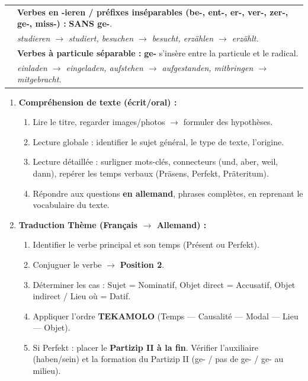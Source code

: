 \documentclass[11pt]{article}
\newcommand{\all}[1]{\ifmmode\text{\textit{#1}}\else\begingroup\selectlanguage{ngerman}\itshape #1\endgroup\fi}
\begin{document}
\begin{propriete}
\begin{center}
\begin{tabularx}{\linewidth}{|X|X|}
& \textbf{Verbes en -ieren / préfixes inséparables (be-, ent-, er-, ver-, zer-, ge-, miss-) :} \textbf{SANS ge-}. \\
& \all{studieren $\to$ studiert}, \all{besuchen $\to$ besucht}, \all{erzählen $\to$ erzählt}. \\
& \textbf{Verbes à particule séparable :} \textbf{ge-} s'insère entre la particule et le radical. \\
& \all{einladen $\to$ eingeladen}, \all{aufstehen $\to$ aufgestanden}, \all{mitbringen $\to$ mitgebracht}. \\
\hline
\end{tabularx}
\end{center}
\end{propriete}

\begin{methode}
\begin{enumerate}
    \item \textbf{Compréhension de texte (écrit/oral) :}
    \begin{enumerate}
        \item Lire le titre, regarder images/photos $\to$ formuler des hypothèses.
        \item Lecture globale : identifier le sujet général, le type de texte, l'origine.
        \item Lecture détaillée : surligner mots-clés, connecteurs (und, aber, weil, dann), repérer les temps verbaux (Präsens, Perfekt, Präteritum).
        \item Répondre aux questions \textbf{en allemand}, phrases complètes, en reprenant le vocabulaire du texte.
    \end{enumerate}
    \item \textbf{Traduction Thème (Français $\to$ Allemand) :}
    \begin{enumerate}
        \item Identifier le verbe principal et son temps (Présent ou Perfekt).
        \item Conjuguer le verbe $\to$ \textbf{Position 2}.
        \item Déterminer les cas : Sujet = Nominatif, Objet direct = Accusatif, Objet indirect / Lieu où = Datif.
        \item Appliquer l'ordre \textbf{TEKAMOLO} (Temps — Causalité — Modal — Lieu — Objet).
        \item Si Perfekt : placer le \textbf{Partizip II à la fin}. Vérifier l'auxiliaire (haben/sein) et la formation du Partizip II (ge- / pas de ge- / ge- au milieu).

\end{enumerate}
\end{enumerate}
\end{methode}
\end{document}
